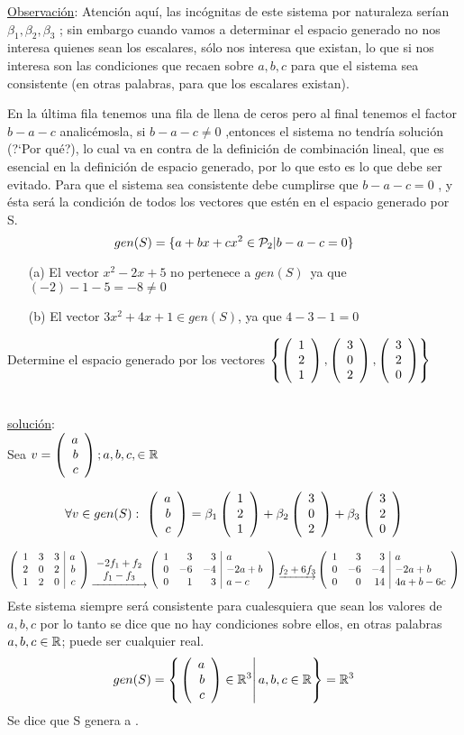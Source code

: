 \underline{Observación}: Atención aquí, las incógnitas de este sistema por naturaleza serían $\beta_1, \beta_2, \beta_3$
; sin embargo cuando vamos a determinar el espacio generado no nos interesa quienes sean los escalares, sólo nos interesa que existan, lo que si nos interesa son las condiciones que recaen sobre $a,b,c$
para que el sistema sea consistente (en otras palabras, para que los escalares existan).


En la última fila tenemos una fila de llena de ceros pero al final tenemos el factor $b-a-c$
analicémosla, si $b-a-c\neq 0$
,entonces el sistema no tendría solución (?`Por qué?), lo cual va
en contra de la definición de combinación lineal, que es esencial en la definición de espacio
generado, por lo que esto es lo que debe ser evitado. Para que el sistema sea consistente debe cumplirse que $b-a-c=0$
, y ésta será la condición de todos los vectores que estén en el
espacio generado por S.
\[gen(S)=
\lbrace
a+b x+c x^2 \in \pdos|
b-a-c=0
\rbrace
\]
\begin{enumerate}

\item[(a)] El vector $x^2-2x+5$ no pertenece a $gen(S)$\ ya que $(-2)-1-5=-8\neq 0$
\item[(b)] El vector $3x^2+4x+1 \in gen(S)$, ya que $4-3-1=0$
\end{enumerate}

\begin{ejemplo}
Determine el espacio generado por los vectores $\llav{ \vectrtres{1}{2}{1}, \vectrtres{3}{0}{2}, \vectrtres{3}{2}{0}}$
\end{ejemplo}

~\\
\underline{solución}:
~\\

Sea $v=\vectrtres{a}{b}{c}; a, b, c, \in \dobler$

\[
\forall v\in gen(S):\ 
\vectrtres{a}{b}{c}=
\beta_1\vectrtres{1}{2}{1}+
\beta_2\vectrtres{3}{0}{2}+
\beta_3\vectrtres{3}{2}{0}
\]

\[
\reducir{rrr|r}{
1&3&3&a\\
2&0&2&b\\
1&2&0&c
}
\underrightarrow{\begin{array}{cc}
    -2f_1 + f_2\\
    f_1 - f_3
\end{array}}
\reducir{rrr|l}{
1&3&3&a\\
0&-6&-4&-2a+b\\
0&1&3&a-c
}
\underrightarrow{f_2 + 6f_3}
\reducir{rrr|l}{
1&3&3&a\\
0&-6&-4&-2a+b\\
0&0&14&4a+b-6c
}
\]
Este sistema siempre ser\'a consistente para cualesquiera que sean los valores de $a, b, c$ por lo
tanto se dice que no hay condiciones sobre ellos, en otras palabras $a, b, c \in \dobler$; puede ser
cualquier real.
\[
gen(S)=
\left\{
\left.
\vectrtres{a}{b}{c} \in \rtres \right|
a, b, c \in \dobler
\right\}=\rtres
\]
Se dice que S genera a \rtres.

